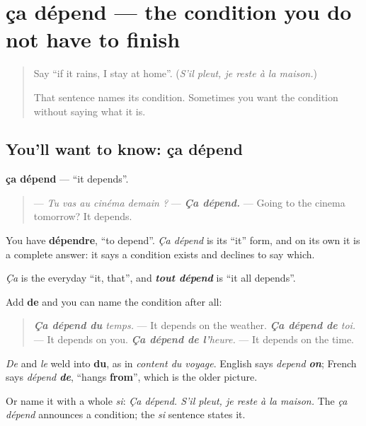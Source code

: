 \section[ça dépend]{ça dépend — the condition you do not have to finish}

\label{lesson:FR-C266-ca-depend}



\begin{quote}
Say \textquotedblleft{}if it rains, I stay at home\textquotedblright{}. (\emph{S'il pleut, je reste à la maison.})

That sentence names its condition. Sometimes you want the condition without saying what it is.
\end{quote}

\subsection*{You'll want to know: ça dépend}
\textbf{ça dépend} — \textquotedblleft{}it depends\textquotedblright{}.

\begin{quote}
— \emph{Tu vas au cinéma demain ?} — \emph{\textbf{Ça dépend.}} — Going to the cinema tomorrow? It depends.
\end{quote}

You have \textbf{dépendre}, \textquotedblleft{}to depend\textquotedblright{}. \emph{Ça dépend} is its \textquotedblleft{}it\textquotedblright{} form, and on its own it is a complete answer: it says a condition exists and declines to say which.

\emph{Ça} is the everyday \textquotedblleft{}it, that\textquotedblright{}, and \emph{\textbf{tout dépend}} is \textquotedblleft{}it all depends\textquotedblright{}.

\begin{grammarlens}[title={Grammar Lens: ça dépend de}]
Add \textbf{de} and you can name the condition after all:

\begin{quote}
\emph{\textbf{Ça dépend du} temps.} — It depends on the weather. \emph{\textbf{Ça dépend de} toi.} — It depends on you. \emph{\textbf{Ça dépend de l'}heure.} — It depends on the time.
\end{quote}

\emph{De} and \emph{le} weld into \textbf{du}, as in \emph{content du voyage}. English says \emph{depend \textbf{on}}; French says \emph{dépend \textbf{de}}, \textquotedblleft{}hangs \textbf{from}\textquotedblright{}, which is the older picture.

Or name it with a whole \emph{si}: \emph{Ça dépend. S'il pleut, je reste à la maison.} The \emph{ça dépend} announces a condition; the \emph{si} sentence states it.
\end{grammarlens}

